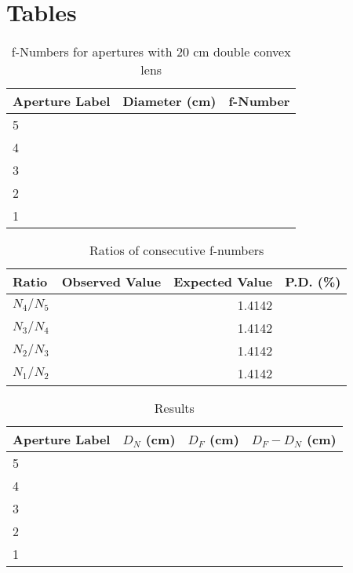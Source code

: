 \section{Tables}
%
\begin{table}[ht]
    \begin{center}
        \begin{tabular}{|l|r|r|}
            \hline
            Aperture Label & Diameter (cm) & f-Number \\
            \hline
            5 & & \\
            4 & & \\
            3 & & \\
            2 & & \\
            1 & & \\
            \hline
        \end{tabular}
    \end{center}
    \caption{f-Numbers for apertures with 20 cm double convex lens}
    \label{table.09.fnumbers}
\end{table}
%
\begin{table}[ht]
    \begin{center}
        \begin{tabular}{|l|r|r|r|}
            \hline
            Ratio & Observed Value & Expected Value & P.D. (\%) \\
            \hline
            $N_{4} / N_{5}$ & & 1.4142 & \\
            $N_{3} / N_{4}$ & & 1.4142 & \\
            $N_{2} / N_{3}$ & & 1.4142 & \\
            $N_{1} / N_{2}$ & & 1.4142 & \\
            \hline
        \end{tabular}
    \end{center}
    \caption{Ratios of consecutive f-numbers}
    \label{table.09.ratios}
\end{table}
%
\begin{table}[ht]
    \begin{center}
        \begin{tabular}{|l|r|r|r|}
            \hline
            Aperture Label & $D_{N}$ (cm) & $D_{F}$ (cm) & $D_{F} - D_{N}$ (cm) \\
            \hline
            5 & & & \\
            4 & & & \\
            3 & & & \\
            2 & & & \\
            1 & & & \\
            \hline
        \end{tabular}
    \end{center}
    \caption{Results}
    \label{table.09.results}
\end{table}
%